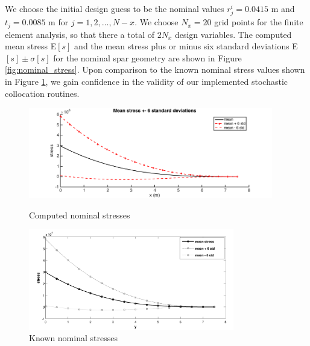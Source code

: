 \documentclass[10pt]{article}
\begin{document}
We choose the initial design guess to be the nominal
values $r^i_j = 0.0415$ m and $t_j = 0.0085$ m for
$j=1,2,\dots,N-x$.
We choose $N_x = 20$ grid points for the finite
element analysis, so that there a total of $2 N_x$
design variables.
The computed mean stress E$[s]$ and the mean
stress plus or minus six standard deviations
E$[s] \pm \sigma[s]$ for the nominal spar
geometry are shown in Figure \ref{fig:nominal_stress}.
Upon comparison to the known nominal stress values
shown in Figure \ref{fig:nominal_stress_hicken},
we gain confidence in the validity of our implemented
stochastic collocation routines.
%
\begin{figure}[hbt!]
\centering
\begin{minipage}[b]{0.5\textwidth}
\includegraphics[width=0.95\textwidth]{nominal_stress}
\caption{Computed nominal stresses}
\label{fig:nominal_stress}
\end{minipage}%
\begin{minipage}[b]{0.5\textwidth}
\includegraphics[width=0.8\textwidth]{nominal_stress_hicken}
\caption{Known nominal stresses}
\label{fig:nominal_stress_hicken}
\end{minipage}
\end{figure}
\end{document}
